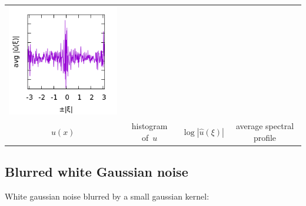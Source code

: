 \begin{tabular}{cccc}
	\includegraphics{w256_p.png} \\
	$u(x)$ &
	histogram of~$u$ &
	$\log|\hat u(\xi)|$ &
	average spectral profile
\end{tabular}


\subsection{Blurred white Gaussian noise}

White gaussian noise blurred by a small gaussian kernel:

